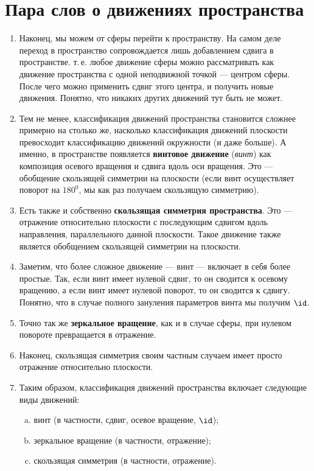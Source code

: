 


\section{Пара слов о движениях пространства}




\begin{enumerate}
\item Наконец, мы можем от сферы перейти к пространству. На самом деле переход в пространство сопровождается лишь добавлением сдвига в пространстве. т.\,е. любое движение сферы можно рассматривать как движение пространства с одной неподвижной точкой --- центром сферы. После чего можно применить сдвиг этого центра, и получить новые движения. Понятно, что никаких других движений тут быть не может.
\item Тем не менее, классификация движений пространства становится сложнее примерно на столько же, насколько классификация движений плоскости превосходит классификацию движений окружности (и даже больше). А именно, в пространстве появляется \textbf{винтовое движение} (\textit{винт}) как композиция осевого вращения и сдвига вдоль оси вращения. Это --- обобщение скользящей симметрии на плоскости (если винт осуществляет поворот на $180^0$, мы как раз получаем скользящую симметрию).
\item Есть также и собственно \textbf{скользящая симметрия пространства}. Это --- отражение относительно плоскости с последующим сдвигом вдоль направления, параллельного данной плоскости. Такое движение также является обобщением скользящей симметрии на плоскости.
\item Заметим, что более сложное движение --- винт --- включает в себя более простые. Так, если винт имеет нулевой сдвиг, то он сводится к осевому вращению, а если винт имеет нулевой поворот, то он сводится к сдвигу. Понятно, что в случае полного зануления параметров винта мы получим $\id$.
\item Точно так же \textbf{зеркальное вращение}, как и в случае сферы, при нулевом повороте превращается в отражение.
\item Наконец, скользящая симметрия своим частным случаем имеет просто отражение относительно плоскости.
\item Таким образом, классификация движений пространства включает следующие виды движений:
\begin{enumerate}[a)]
\item винт (в частности, сдвиг, осевое вращение, $\id$);
\item зеркальное вращение (в частности, отражение);
\item скользящая симметрия (в частности, отражение).
\end{enumerate}
\end{enumerate}



